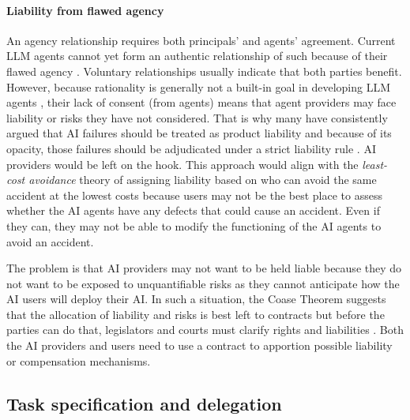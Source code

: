 \documentclass[11pt]{article}
\begin{document}
\paragraph{Liability from flawed agency} An agency relationship requires both principals' and agents' agreement. Current LLM agents cannot yet form an authentic relationship of such because of their flawed agency \citep{barandiaran_transforming_2024,perrier_position_2025}. Voluntary relationships usually indicate that both parties benefit. However, because rationality is generally not a built-in goal in developing LLM agents \citep{macmillan-scott_irrationality_2024}, their lack of consent (from agents) means that agent providers may face liability or risks they have not considered.  That is why many have consistently argued that AI failures should be treated as product liability and because of its opacity, those failures should be adjudicated under a strict liability rule \citep{abraham2019automated,buiten_product_2024,sharkey_products_2024}.  AI providers would be left on the hook.  This approach would align with the \textit{least-cost avoidance} theory of assigning liability based on who can avoid the same accident at the lowest costs \citep{calabresi1972property} because users may not be the best place to assess whether the AI agents have any defects that could cause an accident. Even if they can, they may not be able to modify the functioning of the AI agents to avoid an accident.

The problem is that AI providers may not want to be held liable because they do not want to be exposed to unquantifiable risks as they cannot anticipate how the AI users will deploy their AI.  In such a situation, the Coase Theorem suggests that the allocation of liability and risks is best left to contracts but before the parties can do that, legislators and courts must clarify rights and liabilities \citep{coase1960problem}.  Both the AI providers and users need to use a contract to apportion possible liability or compensation mechanisms.


\subsection{Task specification and delegation}

\end{document}
